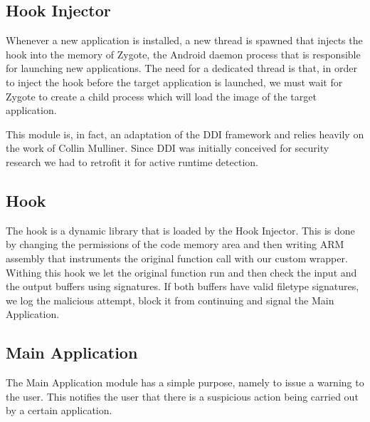 \subsection{Hook Injector}
Whenever a new application is installed, a new thread is spawned that injects
the hook into the memory of Zygote, the Android daemon process that is
responsible for launching new applications. The need for a dedicated thread is
that, in order to inject the hook before the target application is launched, we
must wait for Zygote to create a child process which will load the image of the
target application.

This module is, in fact, an adaptation of the DDI framework and relies heavily
on the work of Collin Mulliner. Since DDI was initially conceived for
security research we had to retrofit it for active runtime detection.

\subsection{Hook}
The hook is a dynamic library that is loaded by the Hook Injector. This is
done by changing the permissions of the code memory area and then writing ARM
assembly that instruments the original function call with our custom wrapper.
Withing this hook we let the original function run and then check the input
and the output buffers using signatures. If both buffers have valid filetype
signatures, we log the malicious attempt, block it from continuing and signal
the Main Application.

\subsection{Main Application}
The Main Application module has a simple purpose, namely to issue a warning to
the user. This notifies the user that there is a suspicious action being carried
out by a certain application.

